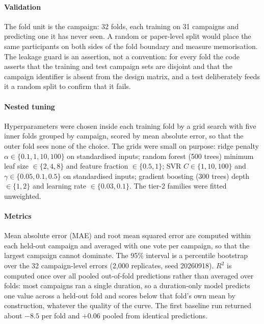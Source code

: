 \paragraph{Validation} The fold unit is the campaign: 32 folds, each training on 31 campaigns and predicting one it
has never seen. A random or paper-level split would place the same participants on both sides of the fold
boundary and measure memorisation. The leakage guard is an assertion, not a convention: for every fold the code
asserts that the training and test campaign sets are disjoint and that the campaign identifier is absent from the
design matrix, and a test deliberately feeds it a random split to confirm that it fails.

\paragraph{Nested tuning} Hyperparameters were chosen inside each training fold by a grid search with five inner
folds grouped by campaign, scored by mean absolute error, so that the outer fold sees none of the choice. The grids
were small on purpose: ridge penalty $\alpha \in \{0.1, 1, 10, 100\}$ on standardised inputs; random forest (500
trees) minimum leaf size $\in \{2, 4, 8\}$ and feature fraction $\in \{0.5, 1\}$; SVR $C \in \{1, 10, 100\}$ and
$\gamma \in \{0.05, 0.1, 0.5\}$ on standardised inputs; gradient boosting (300 trees) depth $\in \{1, 2\}$ and
learning rate $\in \{0.03, 0.1\}$. The tier-2 families were fitted unweighted.

\paragraph{Metrics} Mean absolute error (MAE) and root mean squared error are computed within each held-out
campaign and averaged with one vote per campaign, so that the largest campaign cannot dominate. The 95\% interval is
a percentile bootstrap over the 32 campaign-level errors (2,000 replicates, seed 20260918). $R^2$ is computed once
over all pooled out-of-fold predictions rather than averaged over folds: most campaigns ran a single duration, so a
duration-only model predicts one value across a held-out fold and scores below that fold's own mean by construction,
whatever the quality of the curve. The first baseline run returned about $-8.5$ per fold and $+0.06$ pooled from
identical predictions.

